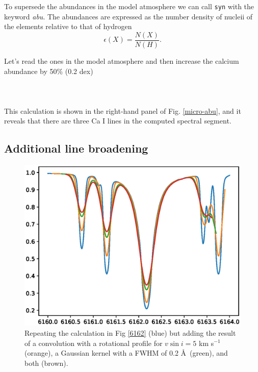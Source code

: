 \documentclass[]{article}
\begin{document}
To supersede the abundances in the model atmosphere we can call {\tt syn} with the keyword {\it abu}. The abundances are expressed as the number density of nucleii of the elements relative to that of hydrogen
\begin{equation}
\epsilon (X) = \frac{N(X)}{N(H)}.
\end{equation}

Let's read the ones in the model atmosphere and then increase the calcium abundance by 50\% (0.2 dex) 
\\
\\
\\
\\
This calculation is shown in the right-hand panel of Fig. \ref{micro-abu}, and it reveals that there are three Ca I lines in the computed spectral segment. 


\subsection{Additional line broadening}
\label{fwhm}

\begin{figure}[t!]
\centering
\includegraphics[width=14cm]{Figure_3.ps}
\caption{Repeating the calculation in Fig \ref{6162} (blue) but adding the result of a convolution with a rotational profile for $v \sin i = 5$ km s$^{-1}$ (orange), a Gaussian kernel with a FWHM of 0.2 \AA\ (green), and both (brown).
\label{convolution}
}
\end{figure}
\end{document}
